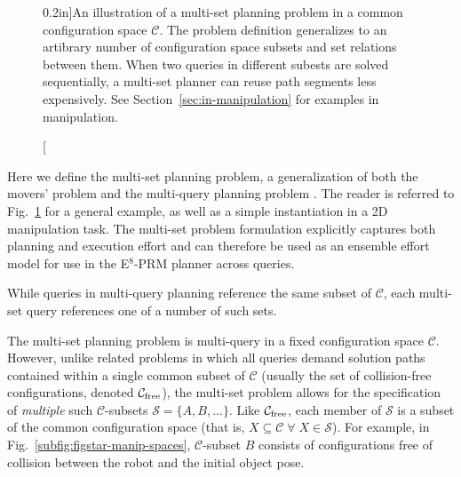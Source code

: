 \begin{figure}
\begin{widepage}
\caption[][0.2in]{An illustration of a multi-set planning
  problem in a common configuration space $\mathcal{C}$.
  The problem definition generalizes to an artibrary number of
  configuration space subsets and set relations between them.
  When two queries in different subests are solved sequentially,
  a multi-set planner can reuse path segments less expensively.
  See Section~\ref{sec:in-manipulation} for examples in
  manipulation.}
\label{fig:multi-set}

\end{widepage}
\end{figure}

Here we define the multi-set planning problem,
a generalization of both the movers' problem
and the multi-query planning problem%
\cite{kavrakietal1996prm}.
The reader is referred to
Fig.~\ref{fig:multi-set}
for a general example,
as well as a simple instantiation in a 2D manipulation task.
The multi-set problem formulation
explicitly captures both planning and execution effort
and can therefore be used as an ensemble effort model
for use in the E$^8$-PRM planner across queries.

\begin{marginfigure}
   \centering
   \vspace{-0.05in}
   \vspace{0.1in}
   \caption{While queries in multi-query planning reference
     the same subset of $\mathcal{C}$,
     each multi-set query references one of a number of such sets.}
   \label{fig:query-to-subset}
\end{marginfigure}

The multi-set planning problem is multi-query in
a fixed configuration space $\mathcal{C}$.
However, unlike related problems in which all
queries demand solution paths contained within a single common subset of
$\mathcal{C}$
(usually the set of collision-free configurations, denoted
$\mathcal{C}_{\mbox{\scriptsize free}}$),
the multi-set problem allows for the specification of
\emph{multiple} such $\mathcal{C}$-subsets
$\mathcal{S} = \{ A, B, \dots \}$.
Like $\mathcal{C}_{\mbox{\scriptsize free}}$,
each member of $\mathcal{S}$
is a subset of the common configuration space
(that is,
$X \subseteq \mathcal{C} \;\forall\; X \in \mathcal{S}$).
For example, in Fig.~\ref{subfig:figstar-manip-spaces},
$\mathcal{C}$-subset $B$
consists of configurations
free of collision between the robot and
the initial object pose.

